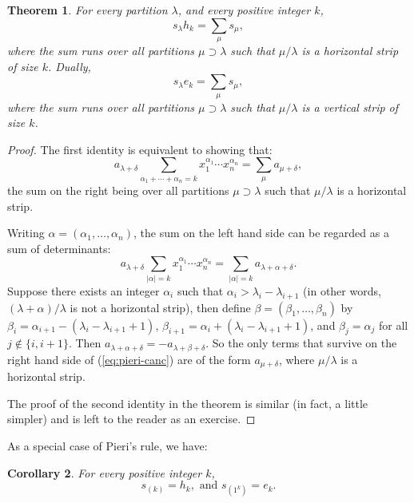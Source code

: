 \documentclass[12pt]{amsart}
\newtheorem{theorem}{Theorem}[subsection]
\newtheorem{corollary}[theorem]{Corollary}
\theoremstyle{definition}
\theoremstyle{example}
\begin{document}
\begin{theorem}
  For every partition $\lambda$, and every positive integer $k$,
  \begin{displaymath}
    s_\lambda h_k = \sum_\mu s_\mu,
  \end{displaymath}
  where the sum runs over all partitions $\mu\supset\lambda$ such that $\mu/\lambda$ is a horizontal strip of size $k$.
  Dually,
  \begin{displaymath}
    s_\lambda e_k = \sum_\mu s_\mu,
  \end{displaymath}
  where the sum runs over all partitions $\mu\supset\lambda$ such that $\mu/\lambda$ is a vertical strip of size $k$.
\end{theorem}
\begin{proof}
  The first identity is equivalent to showing that:
  \begin{displaymath}
    a_{\lambda+\delta} \sum_{\alpha_1+\dotsb+\alpha_n=k} x_1^{\alpha_1}\dotsb x_n^{\alpha_n} = \sum_\mu a_{\mu+\delta},
  \end{displaymath}
  the sum on the right being over all partitions $\mu\supset\lambda$ such that $\mu/\lambda$ is a horizontal strip.

  Writing $\alpha=(\alpha_1,\dotsc,\alpha_n)$, the sum on the left hand side can be regarded as a sum of determinants:
  \begin{equation}
    \label{eq:pieri-canc}
    a_{\lambda+\delta} \sum_{|\alpha|=k} x_1^{\alpha_1}\dotsb x_n^{\alpha_n} = \sum_{|\alpha|=k} a_{\lambda + \alpha + \delta}.
  \end{equation}
  Suppose there exists an integer $\alpha_i$ such that $\alpha_i>\lambda_i-\lambda_{i+1}$ (in other words, $(\lambda + \alpha)/\lambda$ is not a horizontal strip), then define $\beta=(\beta_1,\dotsc,\beta_n)$ by $\beta_i = \alpha_{i+1} - (\lambda_i - \lambda_{i+1} + 1)$, $\beta_{i+1} = \alpha_i + (\lambda_i - \lambda_{i+1} +1)$, and $\beta_j=\alpha_j$ for all $j\notin \{i, i+1\}$.
  Then $a_{\lambda+\alpha+\delta} = -a_{\lambda+\beta+\delta}$.
  So the only terms that survive on the right hand side of (\ref{eq:pieri-canc}) are of the form $a_{\mu+\delta}$, where $\mu/\lambda$ is a horizontal strip.

  The proof of the second identity in the theorem is similar (in fact, a little simpler) and is left to the reader as an exercise.
\end{proof}
As a special case of Pieri's rule, we have:
\begin{corollary}
  For every positive integer $k$,
  \begin{displaymath}
    s_{(k)} = h_k, \text{ and } s_{(1^k)} = e_k.
  \end{displaymath}
\end{corollary}
\end{document}
